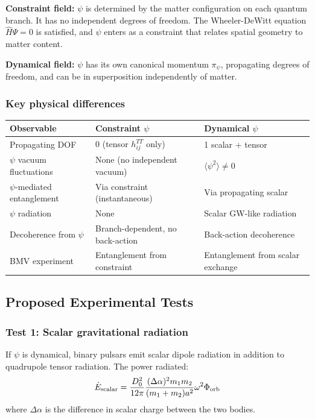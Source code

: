\documentclass[11pt,a4paper]{article}
\begin{document}
\textbf{Constraint field:} $\psi$ is determined by the matter configuration on each quantum branch. It has no independent degrees of freedom. The Wheeler-DeWitt equation $\hat{H}\Psi = 0$ is satisfied, and $\psi$ enters as a constraint that relates spatial geometry to matter content.

\textbf{Dynamical field:} $\psi$ has its own canonical momentum $\pi_\psi$, propagating degrees of freedom, and can be in superposition independently of matter.

\subsubsection{Key physical differences}

\begin{center}
\begin{tabular}{lll}
\toprule
\textbf{Observable} & \textbf{Constraint $\psi$} & \textbf{Dynamical $\psi$} \\
\midrule
Propagating DOF & 0 (tensor $h_{ij}^{TT}$ only) & 1 scalar + tensor \\
$\psi$ vacuum fluctuations & None (no independent vacuum) & $\langle\psi^2\rangle \neq 0$ \\
$\psi$-mediated entanglement & Via constraint (instantaneous) & Via propagating scalar \\
$\psi$ radiation & None & Scalar GW-like radiation \\
Decoherence from $\psi$ & Branch-dependent, no back-action & Back-action decoherence \\
BMV experiment & Entanglement from constraint & Entanglement from scalar exchange \\
\bottomrule
\end{tabular}
\end{center}

\subsection{Proposed Experimental Tests}

\subsubsection{Test 1: Scalar gravitational radiation}

If $\psi$ is dynamical, binary pulsars emit scalar dipole radiation in addition to quadrupole tensor radiation. The power radiated:
\begin{equation}
\dot{E}_{\rm scalar} = \frac{D_0^2}{12\pi}\frac{(\Delta\alpha)^2 m_1 m_2}{(m_1+m_2)a^2}\omega^2 \Phi_{\rm orb}
\end{equation}
where $\Delta\alpha$ is the difference in scalar charge between the two bodies.
\end{document}
